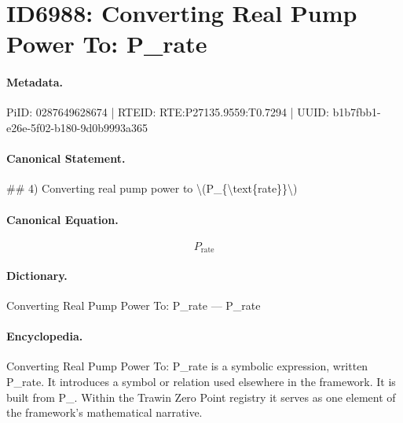 \section*{ID6988: Converting Real Pump Power To: P\_rate}
\paragraph{Metadata.}
PiID: 0287649628674 | RTEID: RTE:P27135.9559:T0.7294 | UUID: b1b7fbb1-e26e-5f02-b180-9d0b9993a365

\paragraph{Canonical Statement.}
\#\# 4) Converting real pump power to \textbackslash{}(P\_\{\textbackslash{}text\{rate\}\}\textbackslash{})

\paragraph{Canonical Equation.}
\[
P_{\text{rate}}
\]

\paragraph{Dictionary.}
Converting Real Pump Power To: P\_rate — P\_rate

\paragraph{Encyclopedia.}
Converting Real Pump Power To: P\_rate is a symbolic expression, written P\_rate. It introduces a symbol or relation used elsewhere in the framework. It is built from P\_. Within the Trawin Zero Point registry it serves as one element of the framework's mathematical narrative.
